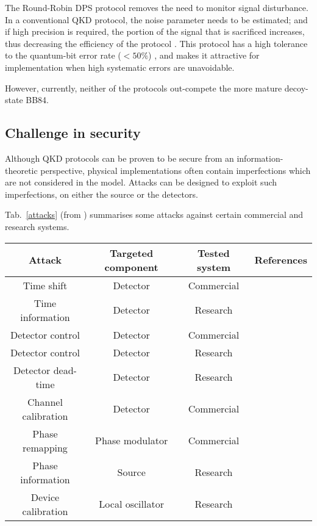 The Round-Robin DPS protocol \cite{bib:sasaki2014practical} removes the need to monitor signal disturbance. In a conventional QKD protocol, the noise parameter needs to be estimated; and if high precision is required, the portion of the signal that is sacrificed increases, thus decreasing the efficiency of the protocol \cite{bib:cai2009finite, bib:hayashi2014security}. This protocol has a high tolerance to the quantum-bit error rate ($< 50\%$) \cite{bib:xu2015discrete}, and makes it attractive for implementation when high systematic errors are unavoidable.   

However, currently, neither of the protocols out-compete the more mature decoy-state BB84.

\subsection{Challenge in security}

Although QKD protocols can be proven to be secure from an information-theoretic perspective, physical implementations often contain imperfections which are not considered in the model. Attacks can be designed to exploit such imperfections, on either the source or the detectors.

Tab.~\ref{attacks} (from \cite{bib:lo2014secure}) summarises some attacks against certain commercial and research systems.

\startnormtable
\begin{table*}[!htbp]
\begin{tabular}{ |c|c|c|c| } 
 \hline
 Attack &  Targeted component & Tested system & References\\ 
  \hline
  \hline
Time shift
        & Detector & Commercial & \cite{bib:qi2005time, bib:PhysRevA.78.042333, bib:PhysRevA.74.022313}\\
Time information & Detector & Research & \cite{bib:lamas2007breaking} \\
Detector control & Detector  &   Commercial & \cite{bib:lydersen2010hacking, bib:yuan2010avoiding}\\
Detector control  & Detector  & Research & \cite{bib:gerhardt2011full} \\
Detector dead-time      & Detector  & Research   & \cite{bib:weier2011quantum}      \\
Channel calibration    & Detector  &  Commercial  & \cite{bib:jain2011device}      \\
Phase remapping  &  Phase modulator & Commercial & \cite{bib:xu2010experimental} \\
Phase information & Source & Research & \cite{bib:tang2013source}          \\
Device calibration  & Local oscillator & Research & \cite{bib:jouguet2013preventing} \\
                \hline
\end{tabular}
\caption{\label{attacks} Summary of various attacks against some commercial and 
research QKD systems}
\end{table*}
\startalgtable

